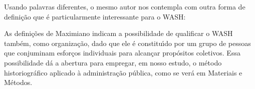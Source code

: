 \documentclass[
12pt,		%
openright,	%
twoside,  %
a4paper,			%
chapter=TITLE,		%
english,			%
french,				%
spanish,			%
brazil				%
]{USPSC-classe/USPSC}
\begin{document}
\noindent\begin{center}\mbox{\centering{}}\end{center}


Usando palavras diferentes, o mesmo autor nos contempla com outra forma de defini\c{c}\~ao que \'e particularmente interessante para o WASH:


















\noindent\begin{center}\mbox{\centering{}}\end{center}


As defini\c{c}\~oes de Maximiano indicam a possibilidade de qualificar o WASH tamb\'em, como organiza\c{c}\~ao, dado que ele \'e constitu\'{\i}do por um grupo de pessoas que conjuminam esfor\c{c}os individuais para alcan\c{c}ar prop\'ositos coletivos. Essa possibilidade d\'a a abertura para empregar, em nosso estudo, o m\'etodo historiogr\'afico aplicado \`a administra\c{c}\~ao p\'ublica, como se ver\'a em Materiais e M\'etodos.
\end{document}
